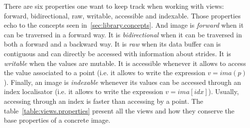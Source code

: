There are six properties one want to keep track when working with views: forward, bidirectional, raw, writable,
accessible and indexable. Those properties echo to the concepts seen in~\cref{sec:library.concepts}. And image is
\emph{forward} when it can be traversed in a forward way. It is \emph{bidirectional} when it can be traversed in both a
forward and a backward way. It is \emph{raw} when its data buffer can is contiguous and can directly be accessed with
information about strides. It is \emph{writable} when the values are mutable. It is accessible whenever it allows to
access the value associated to a point (i.e. it allows to write the expression $v = ima(p)$). Finally, an image is
\emph{indexable} whenever its values can be accessed through an index localisator (i.e. it allows to write the
expression $v = ima[idx]$). Usually, accessing through an index is faster than accessing by a point. The
table~\cref{table:views.properties} present all the views and how they conserve the base properties of a concrete image.

